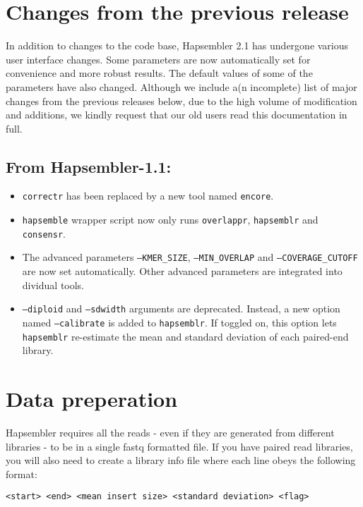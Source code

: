 \documentclass[12pt,a4paper]{report}
\newcommand{\hapversion}{2.1}
\begin{document}
\section{Changes from the previous release}

In addition to changes to the code base, Hapsembler \hapversion{} has undergone various user interface changes. Some parameters are now automatically set for convenience and more robust results. The default values of some of the parameters have also changed. Although we include a(n incomplete) list of major changes from the previous releases below, due to the high volume of modification and additions, we kindly request that our old users read this documentation in full.

\subsection{From Hapsembler-1.1:}

\begin{itemize}
\item \texttt{correctr} has been replaced by a new tool named \texttt{encore}.
\item \texttt{hapsemble} wrapper script now only runs \texttt{overlappr}, \texttt{hapsemblr} and \texttt{consensr}.
\item The advanced parameters \texttt{--KMER\_SIZE}, \texttt{--MIN\_OVERLAP} and \texttt{--COVERAGE\_CUTOFF} are now set automatically. Other advanced parameters are integrated into dividual tools.
\item \texttt{--diploid} and \texttt{--sdwidth} arguments are deprecated. Instead, a new option named \texttt{--calibrate} is added to \texttt{hapsemblr}. If toggled on, this option lets \texttt{hapsemblr} re-estimate the mean and standard deviation of each paired-end library.
\end{itemize}

\section{Data preperation}
\label{data}

Hapsembler requires all the reads - even if they are generated from different libraries - to be in a single fastq formatted file. If you have paired read libraries, you will also need to create a library info file where each line obeys the following format:

\begin{verbatim}
<start> <end> <mean insert size> <standard deviation> <flag>
\end{verbatim}
\end{document}
